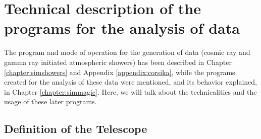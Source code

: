 

\chapter{Technical description of the programs for the analysis of 
  \MC data}
\label{appendix:programs}

The program and mode of operation for the generation of \MC data
(cosmic ray and gamma ray initiated atmospheric showers) has been
described in Chapter \ref{chapter:simshowers} and Appendix
\ref{appendix:corsika}, while the programs created for the analysis of
these \MC data were mentioned, and its behavior explained, in Chapter
\ref{chapter:simmagic}. Here, we will talk about the technicalities
and the usage of these later programs.

\afterpage{\clearpage}


\section{Definition of the Telescope}
\label{sec:ctdef}

